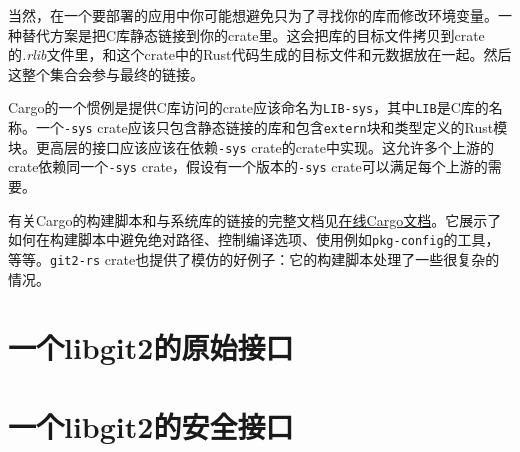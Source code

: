 当然，在一个要部署的应用中你可能想避免只为了寻找你的库而修改环境变量。一种替代方案是把C库静态链接到你的crate里。这会把库的目标文件拷贝到crate的\emph{.rlib}文件里，和这个crate中的Rust代码生成的目标文件和元数据放在一起。然后这整个集合会参与最终的链接。

Cargo的一个惯例是提供C库访问的crate应该命名为\texttt{LIB-sys}，其中\texttt{LIB}是C库的名称。一个\texttt{-sys} crate应该只包含静态链接的库和包含\texttt{extern}块和类型定义的Rust模块。更高层的接口应该应该在依赖\texttt{-sys} crate的crate中实现。这允许多个上游的crate依赖同一个\texttt{-sys} crate，假设有一个版本的\texttt{-sys} crate可以满足每个上游的需要。

有关Cargo的构建脚本和与系统库的链接的完整文档见\href{https://doc.rust-lang.org/cargo/reference/build-scripts.html}{在线Cargo文档}。它展示了如何在构建脚本中避免绝对路径、控制编译选项、使用例如\texttt{pkg-config}的工具，等等。\texttt{git2-rs} crate也提供了模仿的好例子：它的构建脚本处理了一些很复杂的情况。

\section{一个libgit2的原始接口}


\section{一个libgit2的安全接口}\label{SafeInter}